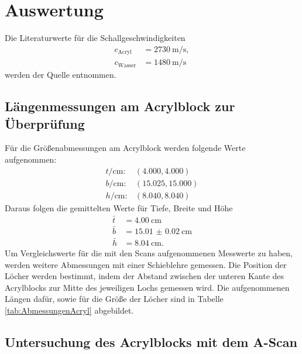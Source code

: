\section{Auswertung}
\label{sec:Auswertung}

Die Literaturwerte für die Schallgeschwindigkeiten
\begin{align}
  c_\text{Acryl} & = \SI{2730}{\meter\per\second}, \\
  c_\text{Wasser} & = \SI{1480}{\meter\per\second}
\end{align}
werden der Quelle \cite{schall} entnommen.

\subsection{Längenmessungen am Acrylblock zur Überprüfung}

Für die Größenabmessungen am Acrylblock werden folgende Werte aufgenommen:
\begin{align}
  t/\si{\centi\meter}: & (4.000 , 4.000) \\
  b/\si{\centi\meter}: & (15.025 , 15.000) \\
  h/\si{\centi\meter}: & (8.040, 8.040)
\end{align}
Daraus folgen die gemittelten Werte für Tiefe, Breite und Höhe
\begin{align}
  \bar{t} & = \SI{4.00}{\centi\meter} \\
  \bar{b} & = \SI{15.01(2)}{\centi\meter} \\
  \bar{h} & = \SI{8.04}{\centi\meter}.
  \label{eqn:AbmessungenAcryl}
\end{align}
Um Vergleichswerte für die mit den Scans aufgenommenen Messwerte zu haben,
werden weitere Abmessungen mit einer Schieblehre gemessen.
Die Position der Löcher werden bestimmt, indem der Abstand zwischen der
unteren Kante des Acrylblocks zur Mitte des jeweiligen Lochs gemessen wird.
Die aufgenommenen Längen dafür, sowie für die Größe der Löcher sind in
Tabelle \ref{tab:AbmessungenAcryl} abgebildet.

\subsection{Untersuchung des Acrylblocks mit dem A-Scan}

